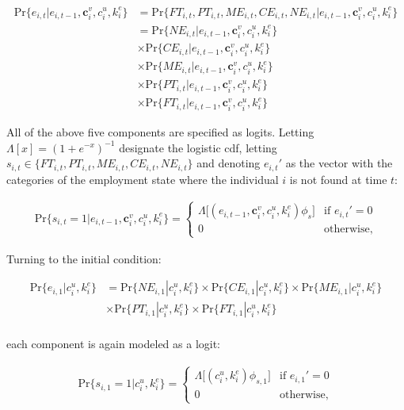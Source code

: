 \documentclass[12pt, a4paper]{article}
\begin{document}
\begin{align}
\text{Pr}\{e_{i,t}|e_{i,t-1},\textbf{c}_{i}^{v},c_{i}^{u},k_{i}^{e}\} & =  \nonumber   \text{Pr}\{FT_{i,t},PT_{i,t},ME_{i,t},CE_{i,t},NE_{i,t}|e_{i,t-1},\textbf{c}_{i}^{v},c_{i}^{u},k_{i}^{e}\}\\
& = \text{Pr}\{NE_{i,t}|e_{i,t-1},\textbf{c}_{i}^{v},c_{i}^{u},k_{i}^{e}\}\\ \nonumber
& \times \text{Pr}\{CE_{i,t}|e_{i,t-1},\textbf{c}_{i}^{v},c_{i}^{u},k_{i}^{e}\}\\ \nonumber
& \times \text{Pr}\{ME_{i,t}|e_{i,t-1},\textbf{c}_{i}^{v},c_{i}^{u},k_{i}^{e}\}\\ \nonumber
& \times \text{Pr}\{PT_{i,t}|e_{i,t-1},\textbf{c}_{i}^{v},c_{i}^{u},k_{i}^{e}\}\\ \nonumber
& \times \text{Pr}\{FT_{i,t}|e_{i,t-1},\textbf{c}_{i}^{v},c_{i}^{u},k_{i}^{e}\}
\end{align}

All of the above five components are specified as logits. Letting $\Lambda[x]=(1+e^{-x})^{-1}$ designate the logistic cdf, letting $s_{i,t}\in\{FT_{i,t},PT_{i,t},ME_{i,t},CE_{i,t},NE_{i,t}\}$ and denoting $e_{i,t}'$ as the vector with the categories of the employment state where the individual $i$ is not found at time $t$:

\begin{align}
\text{Pr}\{s_{i,t}=1|e_{i,t-1},\textbf{c}_{i}^{v},c_{i}^{u},k_{i}^{e}\} = 
\begin{cases}
    \Lambda\Big[(e_{i,t-1},\textbf{c}_{i}^{v},c_{i}^{u},k_{i}^{e})\phi_s\Big]& \text{if } e_{i,t}' = 0\\
    0              & \text{otherwise},
\end{cases}
\end{align}

Turning to the initial condition:

\begin{align}
\text{Pr}\{e_{i,1}|c_{i}^{u},k_{i}^{e}\} & = \text{Pr}\{NE_{i,1}|c_{i}^{u},k_{i}^{e}\} \times \text{Pr}\{CE_{i,1}|c_{i}^{u},k_{i}^{e}\}\times \text{Pr}\{ME_{i,1}|c_{i}^{u},k_{i}^{e}\}\\ \nonumber
& \times \text{Pr}\{PT_{i,1}|c_{i}^{u},k_{i}^{e}\} \times \text{Pr}\{FT_{i,1}|c_{i}^{u},k_{i}^{e}\}\\ \nonumber
\end{align}

each component is again modeled as a logit:

\begin{align}
\text{Pr}\{s_{i,1}=1|c_{i}^{u},k_{i}^{e}\} = 
\begin{cases}
    \Lambda\Big[(c_{i}^{u},k_{i}^{e})\phi_{s,1}\Big]& \text{if } e_{i,1}' = 0\\
    0              & \text{otherwise},
\end{cases}
\end{align}
\end{document}
